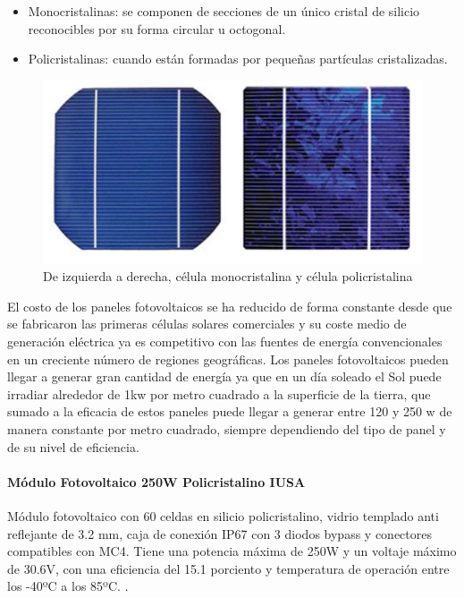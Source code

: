 \begin{itemize}
	\item Monocristalinas: se componen de secciones de un único cristal de silicio reconocibles por su forma circular u octogonal.
	\item Policristalinas: cuando están formadas por pequeñas partículas cristalizadas.
\end{itemize}

\begin{figure}[H]
	\centering
	\includegraphics[scale=.50]{Capitulo2/images/tipospaneles.jpg}
	\caption{De izquierda a derecha, célula monocristalina y célula policristalina}
	\label{fig:diagrama_dispensador}
\end{figure}

El costo de los paneles fotovoltaicos se ha reducido de forma constante desde que se fabricaron las primeras células solares comerciales y su coste medio de generación eléctrica ya es competitivo con las fuentes de energía convencionales en un creciente número de regiones geográficas.
Los paneles fotovoltaicos pueden llegar a generar gran cantidad de energía ya que en un día soleado el Sol puede irradiar alrededor de 1kw por metro cuadrado a la superficie de la tierra, que sumado a la eficacia de estos paneles puede llegar a generar entre 120 y 250 w de manera constante por metro cuadrado, siempre dependiendo del tipo de panel y de su nivel de eficiencia.

\paragraph{Módulo Fotovoltaico 250W Policristalino IUSA}
Módulo fotovoltaico con 60 celdas en silicio policristalino, vidrio templado anti reflejante de 3.2 mm, caja de conexión IP67 con 3 diodos bypass y conectores compatibles con MC4.
Tiene una potencia máxima de 250W y un voltaje máximo de 30.6V, con una eficiencia del 15.1 porciento y temperatura de operación entre los -40ºC a los 85ºC. \citep{MarcoTeorico3}.

